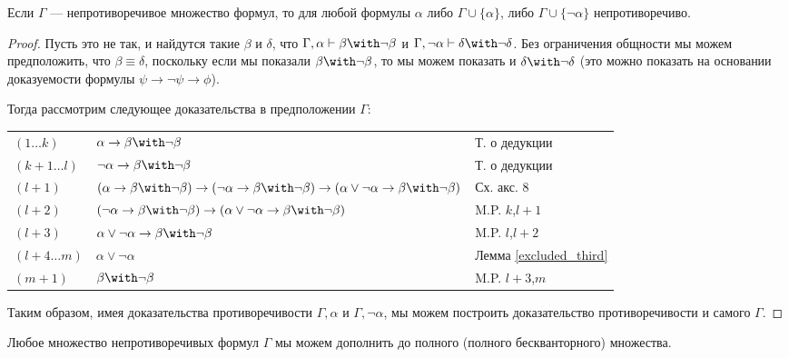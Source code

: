 \begin{lemma}
Если $\Gamma$ --- непротиворечивое множество формул, то для любой формулы
$\alpha$ либо $\Gamma \cup \{\alpha\}$, либо $\Gamma \cup \{\neg\alpha\}$
непротиворечиво.
\end{lemma}

\begin{proof}
Пусть это не так, и найдутся такие $\beta$ и $\delta$, что
$\Gamma, \alpha \vdash \beta \with \neg \beta$ и
$\Gamma, \neg\alpha \vdash \delta \with \neg \delta$.
Без ограничения общности мы можем предположить, что $\beta \equiv \delta$,
поскольку если мы показали $\beta \with \neg \beta$, то мы можем показать и
$\delta \with \neg \delta$ (это можно показать на основании доказуемости формулы 
$\psi \rightarrow \neg\psi \rightarrow \phi$).

Тогда рассмотрим следующее доказательства в предположении $\Gamma$:

\begin{tabular}{lll}\\
$(1\dots k)$ & $\alpha \rightarrow \beta \with \neg\beta$ & Т. о дедукции\\
$(k+1 \dots l)$ & $\neg\alpha \rightarrow \beta \with \neg\beta$ & Т. о дедукции\\
$(l+1)$ & $(\alpha \rightarrow \beta \with \neg\beta) \rightarrow (\neg\alpha\rightarrow \beta \with \neg\beta) \rightarrow (\alpha\vee\neg\alpha\rightarrow \beta \with \neg\beta)$ & Сх. акс. 8\\
$(l+2)$ & $(\neg\alpha\rightarrow \beta \with \neg\beta) \rightarrow (\alpha\vee\neg\alpha\rightarrow \beta \with \neg\beta)$ & M.P. $k$,$l+1$\\
$(l+3)$ & $\alpha\vee\neg\alpha\rightarrow \beta \with \neg\beta$ & M.P. $l$,$l+2$\\
$(l+4 \dots m)$ & $\alpha\vee\neg\alpha$ & Лемма \ref{excluded_third}\\
$(m+1)$ & $\beta \with \neg\beta$ & M.P. $l+3$,$m$
\end{tabular}

Таким образом, имея доказательства противоречивости $\Gamma,\alpha$ и
$\Gamma,\neg\alpha$, мы можем построить доказательство противоречивости и 
самого $\Gamma$.

\end{proof}

\begin{theorem}\label{make_full_set}
Любое множество непротиворечивых формул $\Gamma$ мы можем дополнить до полного
(полного бескванторного) множества.
\end{theorem}

